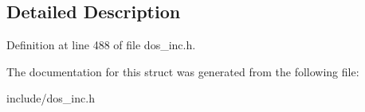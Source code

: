 \subsection{Detailed Description}


Definition at line 488 of file dos\-\_\-inc.\-h.



The documentation for this struct was generated from the following file\-:\begin{DoxyCompactItemize}
\item 
include/dos\-\_\-inc.\-h\end{DoxyCompactItemize}
